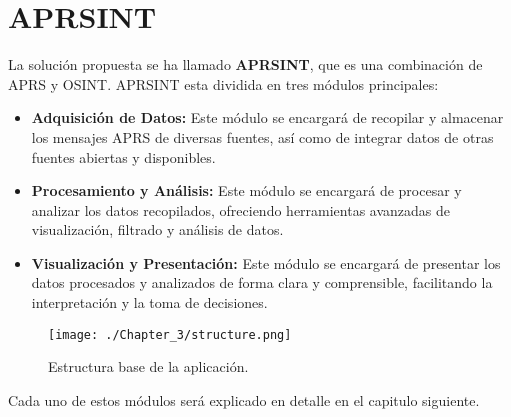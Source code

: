 \section{APRSINT}
La solución propuesta se ha llamado \textbf{APRSINT}, que es una combinación de APRS y OSINT. APRSINT esta dividida en tres módulos principales:
\begin{itemize}
	\item \textbf{Adquisición de Datos:} Este módulo se encargará de recopilar y almacenar los mensajes APRS de diversas fuentes, así como de integrar datos de otras fuentes abiertas y disponibles.
	\item \textbf{Procesamiento y Análisis:} Este módulo se encargará de procesar y analizar los datos recopilados, ofreciendo herramientas avanzadas de visualización, filtrado y análisis de datos.
	\item \textbf{Visualización y Presentación:} Este módulo se encargará de presentar los datos procesados y analizados de forma clara y comprensible, facilitando la interpretación y la toma de decisiones.
\end{itemize}




\begin{figure}[h]
    \centering
    \texttt{[image: ./Chapter\_3/structure.png]}
    \caption{Estructura base de la aplicación.}
    \label{fig:aprsint-logo}
\end{figure}

Cada uno de estos módulos será explicado en detalle en el capitulo siguiente.


